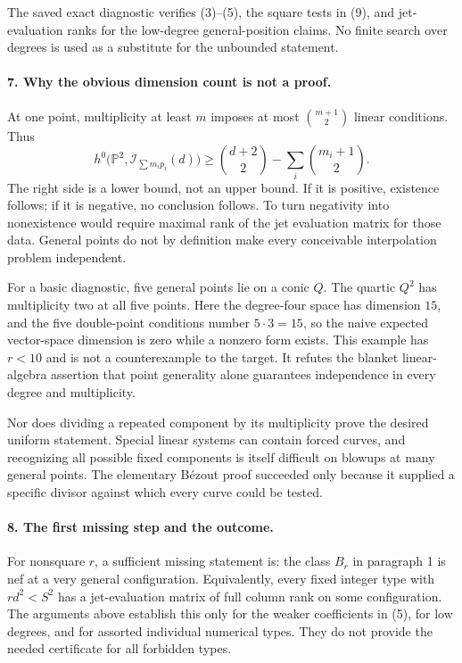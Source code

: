 \documentclass[11pt]{article}
\begin{document}
The saved exact diagnostic verifies (3)--(5), the square tests in (9), and jet-evaluation ranks for the low-degree general-position claims. No finite search over degrees is used as a substitute for the unbounded statement.

\paragraph{7. Why the obvious dimension count is not a proof.}
At one point, multiplicity at least $m$ imposes at most $\binom{m+1}{2}$ linear conditions. Thus
\[
 h^0\bigl(\mathbb P^2,\mathcal I_{\sum m_ip_i}(d)\bigr)
 \ge \binom{d+2}{2}-\sum_i\binom{m_i+1}{2}.             \tag{10}
\]
The right side is a lower bound, not an upper bound. If it is positive, existence follows; if it is negative, no conclusion follows. To turn negativity into nonexistence would require maximal rank of the jet evaluation matrix for those data. General points do not by definition make every conceivable interpolation problem independent.

For a basic diagnostic, five general points lie on a conic $Q$. The quartic $Q^2$ has multiplicity two at all five points. Here the degree-four space has dimension $15$, and the five double-point conditions number $5\cdot3=15$, so the naive expected vector-space dimension is zero while a nonzero form exists. This example has $r<10$ and is not a counterexample to the target. It refutes the blanket linear-algebra assertion that point generality alone guarantees independence in every degree and multiplicity.

Nor does dividing a repeated component by its multiplicity prove the desired uniform statement. Special linear systems can contain forced curves, and recognizing all possible fixed components is itself difficult on blowups at many general points. The elementary B\'ezout proof succeeded only because it supplied a specific divisor against which every curve could be tested.

\paragraph{8. The first missing step and the outcome.}
For nonsquare $r$, a sufficient missing statement is: the class $B_r$ in paragraph 1 is nef at a very general configuration. Equivalently, every fixed integer type with $rd^2<S^2$ has a jet-evaluation matrix of full column rank on some configuration. The arguments above establish this only for the weaker coefficients in (5), for low degrees, and for assorted individual numerical types. They do not provide the needed certificate for all forbidden types.
\end{document}
